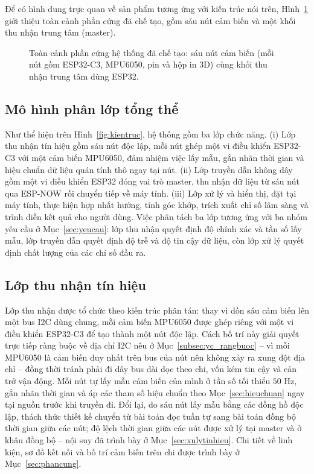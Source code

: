 \documentclass[../DoAn.tex]{subfiles}
\begin{document}
Để có hình dung trực quan về sản phẩm tương ứng với kiến trúc nói trên,
Hình~\ref{fig:fullsystem} giới thiệu toàn cảnh phần cứng đã chế tạo, gồm sáu nút
cảm biến và một khối thu nhận trung tâm (master).

\begin{figure}[h]
    \centering
    \caption{Toàn cảnh phần cứng hệ thống đã chế tạo: sáu nút cảm biến (mỗi nút gồm ESP32-C3, MPU6050, pin và hộp in 3D) cùng khối thu nhận trung tâm dùng ESP32.}
    \label{fig:fullsystem}
\end{figure}

\subsection{Mô hình phân lớp tổng thể}
\label{subsec:kt_phanlop}
Như thể hiện trên Hình~\ref{fig:kientruc}, hệ thống gồm ba lớp chức năng. (i) Lớp
thu nhận tín hiệu gồm sáu nút độc lập, mỗi nút ghép một vi điều khiển ESP32-C3 với
một cảm biến MPU6050, đảm nhiệm việc lấy mẫu, gắn nhãn thời gian và hiệu chuẩn dữ
liệu quán tính thô ngay tại nút. (ii) Lớp truyền dẫn không dây gồm một vi điều
khiển ESP32 đóng vai trò master, thu nhận dữ liệu từ sáu nút qua ESP-NOW rồi
chuyển tiếp về máy tính. (iii) Lớp xử lý và
hiển thị, đặt tại máy tính, thực hiện hợp nhất hướng, tính góc khớp, trích xuất chỉ
số lâm sàng và trình diễn kết quả cho người dùng. Việc phân tách ba lớp tương ứng
với ba nhóm yêu cầu ở Mục~\ref{sec:yeucau}: lớp thu nhận quyết định độ chính xác
và tần số lấy mẫu, lớp truyền dẫn quyết định độ trễ và độ tin cậy dữ liệu, còn lớp
xử lý quyết định chất lượng của các chỉ số đầu ra.

\subsection{Lớp thu nhận tín hiệu}
\label{subsec:kt_thunhan}
Lớp thu nhận được tổ chức theo kiến trúc phân tán: thay vì dồn sáu cảm biến lên
một bus I2C dùng chung, mỗi cảm biến MPU6050 được ghép riêng với một vi điều khiển
ESP32-C3 để tạo thành một nút độc lập. Cách bố trí này giải quyết trực tiếp ràng
buộc về địa chỉ I2C nêu ở Mục~\ref{subsec:yc_rangbuoc} -- vì mỗi MPU6050 là cảm
biến duy nhất trên bus của nút nên không xảy ra xung đột địa chỉ -- đồng thời tránh
phải đi dây bus dài dọc theo chi, vốn kém tin cậy và cản trở vận động. Mỗi nút tự
lấy mẫu cảm biến của mình ở tần số tối thiểu $50$ Hz, gắn nhãn thời gian và áp các
tham số hiệu chuẩn theo Mục~\ref{sec:hieuchuan} ngay tại nguồn trước khi truyền
đi. Đổi lại, do sáu nút lấy mẫu bằng các đồng hồ độc lập, thách thức thiết kế
chuyển từ bài toán đọc tuần tự sang bài toán đồng bộ thời gian giữa các nút; độ
lệch thời gian giữa các nút được xử lý tại master và ở khâu đồng bộ -- nội suy đã
trình bày ở Mục~\ref{sec:xulytinhieu}. Chi tiết về linh kiện, sơ đồ kết nối và bố
trí cảm biến trên chi được trình bày ở Mục~\ref{sec:phancung}.
\end{document}
